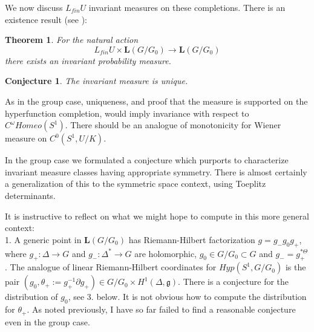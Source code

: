 \documentclass{amsart}
\newtheorem{theorem}{Theorem}[section]
\theoremstyle{conjecture}
\newtheorem{conjecture}{Conjecture}
\theoremstyle{definition}
\theoremstyle{question}
\theoremstyle{questions}
\theoremstyle{remark}
\theoremstyle{remarks}
\theoremstyle{example}
\numberwithin{equation}{section}
\begin{document}
We now discuss $L_{fin}U$ invariant measures on these completions. There is an existence result (see \cite{Pi2}):

\begin{theorem} For the natural action
$$L_{fin}U \times \mathbf L(G/G_0) \to \mathbf L(G/G_0)$$
there exists an invariant probability measure.
\end{theorem}

\begin{conjecture} The invariant measure is unique.
\end{conjecture}

As in the group case, uniqueness, and proof that the measure is supported on the hyperfunction completion, would imply
invariance with respect to $C^{\omega}Homeo(S^1)$. There should be an analogue of monotonicity for Wiener measure
on $C^0(S^1,U/K)$.

In the group case we formulated a conjecture which purports to characterize invariant measure classes
having appropriate symmetry. There is almost certainly a generalization of this to the symmetric space context, using
Toeplitz determinants. 

It is instructive to reflect on what we might hope to compute in this more general context:\\

1. A generic point in $\mathbf L(G/G_0)$ has Riemann-Hilbert factorization
$g=g_- g_0 g_+$, where $g_+:\Delta \to G$ and $g_-:\Delta^* \to G$ are holomorphic,
$g_0\in G/G_0 \subset G$ and $g_-=g_+^{*\Theta}$. The analogue of linear Riemann-Hilbert coordinates
for $Hyp(S^1,G/G_0)$ is the pair $(g_0,\theta_+:=g_+^{-1}\partial g_+)\in G/G_0 \times H^1(\Delta,\mathfrak g)$.
There is a conjecture for the distribution
 of $g_0$, see 3. below. It is not obvious how to compute the distribution
for $\theta_+$. As noted previously, I have so far failed
to find a reasonable conjecture even in the group case. \\
\end{document}
